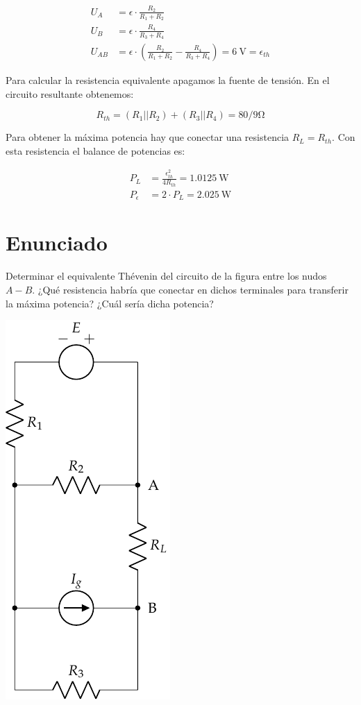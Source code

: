 \begin{align*}
  U_A &= \epsilon \cdot \frac{R_2}{R_1 + R_2}\\
  U_B &= \epsilon \cdot \frac{R_4}{R_3 + R_4}\\
  U_{AB} &= \epsilon \cdot (\frac{R_2}{R_1 + R_2} -  \frac{R_4}{R_3 + R_4}) = \qty{6}{\volt} = \epsilon_{th}
\end{align*}

Para calcular la resistencia equivalente apagamos la fuente de
tensión. En el circuito resultante obtenemos:

\begin{equation*}
  R_{th} = (R_1 || R_2) + (R_3 || R_4) = 80/9\si{\ohm}
\end{equation*}

Para obtener la máxima potencia hay que conectar una resistencia
$R_L = R_{th}$. Con esta resistencia el balance de potencias es:

\begin{align*}
  P_L &= \frac{\epsilon_{th}^2}{4R_{th}} = \qty{1.0125}{\watt}\\
  P_\epsilon &= 2 \cdot P_L = \qty{2.025}{\watt}
\end{align*}


\section{Enunciado}
Determinar el equivalente Thévenin del circuito de la figura entre los
nudos $A-B$. ¿Qué resistencia habría que conectar en dichos terminales
para transferir la máxima potencia? ¿Cuál sería dicha potencia?

\begin{center}
  \includegraphics{figuras/BT1_17.pdf}
\end{center}

